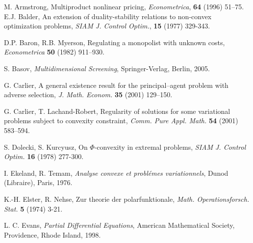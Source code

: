 \documentclass[a4paper, 11pt]{amsart}
\numberwithin{equation}{section}
\theoremstyle{plain}
\theoremstyle{definition}
\theoremstyle{remark}
\begin{document}
\bigskip












\begin{thebibliography}{BCDE}
	
{	 
	M. Armstrong, 
	Multiproduct nonlinear pricing, 
	{\em Econometrica}, {\bf 64 }(1996) 51–75.
}	
		E.J. Balder, 
		An extension of duality-stability relations to non-convex optimization problems, 
		{\em SIAM J. Control Optim.}, {\bf 15} (1977) 329-343.
	
	D.P. Baron, R.B. Myerson, 
	Regulating a monopolist with unknown costs, 
	{\em Econometrica} {\bf 50} (1982) 911–930.
	
	S. Basov, 
	{\em Multidimensional Screening}, 
	Springer-Verlag, Berlin, 2005.
	
	G. Carlier, 
	A general existence result for the principal–agent problem with adverse selection, 
	{\em J. Math. Econom.} {\bf 35} (2001) 129–150.
	
	G. Carlier, T. Lachand-Robert, 
	Regularity of solutions for some variational problems subject to convexity constraint, 
	{\em Comm. Pure Appl. Math.} {\bf 54} (2001) 583–594.
	
{	 
	S. Dolecki, S. Kurcyusz, 
	On $\Phi$-convexity in extremal problems, 
	{\em SIAM J. Control Optim.} {\bf 16} (1978)  277-300.
}

	I. Ekeland, R. Temam,
	 {\em Analyse convexe et probl\'emes variationnels},
	 Dunod (Libraire), Paris, 1976.

{
	K.-H. Elster, R. Nehse, 
	Zur theorie der polarfunktionale, 
	{\em Math. Operationsforsch. Stat.} {\bf 5} (1974) 3-21.
}

	L. C. Evans, 
	{\em Partial Differential Equations},
	American Mathematical Society, Providence, Rhode Island, 1998.
	


\end{thebibliography}
\end{document}
